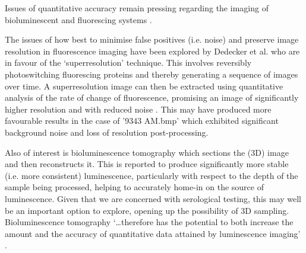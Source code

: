 \documentclass[a4paper]{article}
\begin{document}
\begin{multicols*}{2}
Issues of quantitative accuracy remain pressing regarding the imaging of bioluminescent and fluorescing systems \citep{taylor2015accounting}. 

The issues of how best to minimise false positives (i.e. noise) and preserve image resolution in fluorescence imaging have been explored by Dedecker et al. who are in favour of the ‘superresolution’ technique. This involves reversibly photoswitching fluorescing proteins and thereby generating a sequence of images over time. A superresolution image can then be extracted using quantitative analysis of the rate of change of fluorescence, promising an image of significantly higher resolution and with reduced noise \citep{dedecker2012widely}. This may have produced more favourable results in the case of '9343 AM.bmp' which exhibited significant background noise and loss of resolution post-processing.

Also of interest is bioluminescence tomography which sections the (3D) image and then reconstructs it. This is reported to produce significantly more stable (i.e. more consistent) luminescence, particularly with respect to the depth of the sample being processed, helping to accurately home-in on the source of luminescence. Given that we are concerned with serological testing, this may well be an important option to explore, opening up the possibility of 3D sampling. Bioluminescence tomography ‘…therefore has the potential to both increase the amount and the accuracy of quantitative data attained by luminescence imaging’ \citep{guggenheim2013bioluminescence}.




\end{multicols*}
\end{document}
